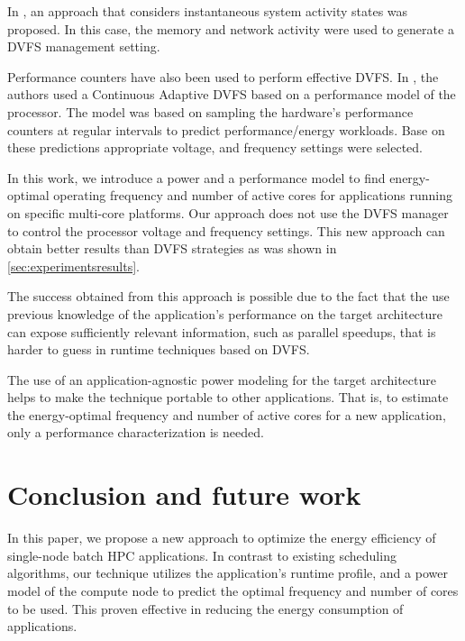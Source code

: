 In \cite{DaCosta2015}, an approach that considers instantaneous system activity states was proposed. In this case, the memory and network activity were used to generate a DVFS management setting.

Performance counters have also been used to perform effective DVFS. In \cite{Spiliopoulos2011}, the authors used a Continuous Adaptive DVFS based on a performance model of the processor. The model was based on sampling the hardware's performance counters at regular intervals to predict performance/energy workloads. Base on these predictions appropriate voltage, and frequency settings were selected.

In this work, we introduce a power and a performance model to find energy-optimal operating frequency and number of active cores for applications running on specific multi-core platforms. Our approach does not use the DVFS manager to control the processor voltage and frequency settings. This new approach can obtain better results than DVFS strategies as was shown in \cref{sec:experimentsresults}. 

The success obtained from this approach is possible due to the fact that the use previous knowledge of the application's performance on the target architecture can expose sufficiently relevant information, such as parallel speedups, that is harder to guess in runtime techniques based on DVFS.

The use of an application-agnostic power modeling for the target architecture helps to make the technique portable to other applications. That is, to estimate the energy-optimal frequency and number of active cores for a new application, only a performance characterization is needed.

\section{Conclusion and future work} \label{sec:conclusion}
In this paper, we propose a new approach to optimize the energy efficiency of single-node batch HPC applications. In contrast to existing scheduling algorithms, our technique utilizes the application's runtime profile, and a power model of the compute node to predict the optimal frequency and number of cores to be used. This proven effective in reducing the energy consumption of applications. 

